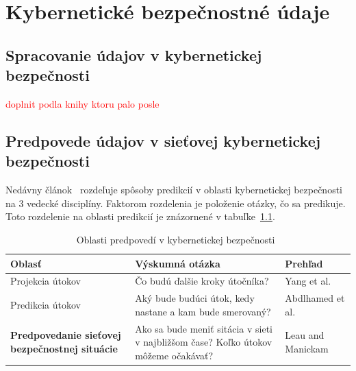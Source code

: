 \documentclass[thesismargins, thesislinespacing, openright, upjsfrontpage, combineabstracts]{rnthesis}
\begin{document}


% 
\chapter{Kybernetické bezpečnostné údaje}

\section{Spracovanie údajov v kybernetickej bezpečnosti}

\textcolor{red}{doplnit podla knihy ktoru palo posle}

\section{Predpovede údajov v sieťovej kybernetickej bezpečnosti} \label{discipliny}

Nedávny článok~\cite{Husak2018survey} rozdeľuje spôsoby predikcií v oblasti kybernetickej bezpečnosti na 3 vedecké disciplíny. Faktorom rozdelenia je položenie otázky, čo sa predikuje. Toto rozdelenie na oblasti predikcií je znázornené v tabuľke~\ref{Tab:husak}.

\begin{table}
\begin{center}
\begin{tabular}{ | p{4cm} | p{6cm} | p{3cm} | }
\hline
\textbf{Oblasť} & \textbf{Výskumná otázka} & \textbf{Prehľad} \\
\hline
\hline Projekcia útokov & Čo budú ďalšie kroky útočníka? & Yang et al.~\cite{Yang2014} \\
\hline Predikcia útokov & Aký bude budúci útok, kedy nastane a kam bude smerovaný? & Abdlhamed et al.~\cite{Abdlhamed2017} \\
\hline \textbf{Predpovedanie sieťovej bezpečnostnej situácie} & Ako sa bude meniť sitácia v sieti v najbližšom čase? Koľko útokov môžeme očakávať? & Leau and  Manickam~\cite{Leau2015} \\
\hline
\end{tabular}
\end{center}
\label{Tab:husak}
\caption{Oblasti predpovedí v kybernetickej bezpečnosti~\cite{Husak2018survey}}
\end{table}
\end{document}
